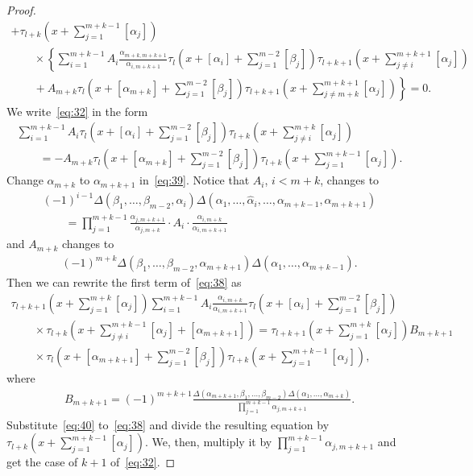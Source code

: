 \documentclass[pdftex]{sigma}
\begin{document}
\begin{proof}
\begin{gather}
+\tau_{l+k}\left(x+ \sum_{j=1}^{m+k-1}[\alpha_j]\right)
\nonumber
\\
\qquad
{}\times
\left\{\sum_{i=1}^{m+k-1}A_i\frac{\alpha_{m+k,m+k+1}}
{\alpha_{i,m+k+1}}\tau_l\left(x+[\alpha_i]+\sum_{j=1}^{m-2}[\beta_j]\right)\tau_{l+k+1}
\left(x+\sum_{j\neq i}^{m+k+1}[\alpha_j]\right)\right.
\nonumber
\\
\left.\qquad
{}+A_{m+k}\tau_l\left(x+[\alpha_{m+k}]+\sum_{j=1}^{m-2}[\beta_j]\right)
\tau_{l+k+1}\left(x+\sum_{j\neq m+k}^{m+k+1}[\alpha_j]\right)\right\}=0.
\label{eq:38}
\end{gather}
We write~\eqref{eq:32} in the form
\begin{gather}
\sum_{i=1}^{m+k-1}A_i\tau_l\left(x+[\alpha_i]+\sum_{j=1}^{m-2}[\beta_j]\right)\tau_{l+k}
\left(x+\sum_{j\neq i}^{m+k}[\alpha_j]\right)\nonumber
\\
\qquad
{}=-A_{m+k}\tau_l\left(x+[\alpha_{m+k}]+\sum_{j=1}^{m-2}[\beta_j]\right)\tau_{l+k}
\left(x+\sum_{j=1}^{m+k-1}[\alpha_j]\right).
\label{eq:39}
\end{gather}
Change $\alpha_{m+k}$ to $\alpha_{m+k+1}$ in~\eqref{eq:39}.
Notice that $A_i$, $i<m+k$, changes to
\begin{gather*}
(-1)^{i-1}\Delta(\beta_1,\dots,\beta_{m-2},\alpha_i)\Delta(\alpha_1,\dots,\hat{\alpha}
_i,\dots,\alpha_{m+k-1},\alpha_{m+k+1})
\\
\qquad
=\prod_{j=1}^{m+k-1}\frac{\alpha_{j,m+k+1}}{\alpha_{j,m+k}}
\cdot A_i\cdot\frac{\alpha_{i,{m+k}}}{\alpha_{i,{m+k+1}}}
\end{gather*}
and $A_{m+k}$ changes to
\begin{gather*}
(-1)^{m+k}\Delta(\beta_1,\dots,\beta_{m-2},\alpha_{m+k+1})\Delta(\alpha_1,\dots,\alpha_{m+k-1}).
\end{gather*}
Then we can rewrite the f\/irst term of~\eqref{eq:38} as
\begin{gather}
\tau_{l+k+1}\left(x+\sum_{j=1}^{m+k}[\alpha_j]\right)\sum_{i=1}^{m+k-1}A_i\frac{\alpha_{i,m+k}}{\alpha_{i,m+k+1}}
\tau_l\left(x+[\alpha_i]+\sum_{j=1}^{m-2}[\beta_j]\right)
\nonumber
\\
\qquad
{}\times
\tau_{l+k}\left(x+ \sum_{j\neq i}^{m+k-1}
[\alpha_j]+[\alpha_{m+k+1}]\right)
=\tau_{l+k+1}\left(x+\sum_{j=1}^{m+k}[\alpha_j]\right)B_{m+k+1}
\nonumber
\\
\qquad
{}\times\tau_l \left(x+[\alpha_{m+k+1}]+\sum_{j=1}^{m-2}
[\beta_j]\right)\tau_{l+k}\left(x+\sum_{j=1}^{m+k-1}[\alpha_j]\right),
\label{eq:40}
\end{gather}
where
\begin{gather*}
B_{m+k+1}=(-1)^{m+k+1}\frac{\Delta(\alpha_{m+k+1},\beta_1,\dots,\beta_{m-2}
)\Delta(\alpha_1,\dots,\alpha_{m+k})}{\prod\limits_{j=1}^{m+k-1}\alpha_{j,m+k+1}}.
\end{gather*}
Substitute~\eqref{eq:40} to~\eqref{eq:38} and divide the resulting equation by
$\tau_{l+k}\left(x+\sum\limits_{j=1}^{m+k-1}[\alpha_j]\right)$.
We, then, multiply it by $\prod\limits_{j=1}^{m+k-1}\alpha_{j,{m+k+1}}$ and get the case of $k+1$ of~\eqref{eq:32}.
\end{proof}
\end{document}

